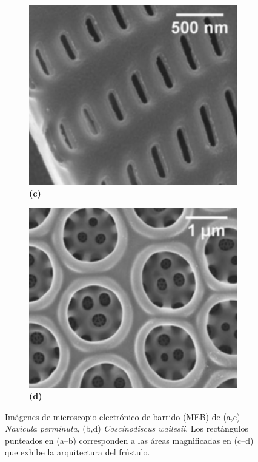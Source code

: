 \documentclass[10pt,aspectratio=1610,compress,dvipsnames]{beamer}
\begin{document}
\begin{frame}
{\begin{figure}
  \begin{subfigure}[b]{0.2\linewidth}
    \includegraphics[width=0.9\linewidth]{Frustrulespictures/Screen Shot 2023-07-02 at 8.25.17 PM.png} %
    \caption*{\textbf{(c)}}
    \label{fig7:c}
  \end{subfigure}\hspace{0.5cm} %
  \begin{subfigure}[b]{0.2\linewidth}
    \includegraphics[width=0.9\linewidth]{Frustrulespictures/Screen Shot 2023-07-02 at 8.25.43 PM.png} %
    \caption*{\textbf{(d)}}
    \label{fig7:d}
  \end{subfigure}
  \caption{
Imágenes de microscopio electrónico de barrido (MEB) de (a,c) - \emph{Navicula perminuta}, (b,d) \emph{Coscinodiscus wailesii}. Los rectángulos punteados en (a–b) corresponden a las áreas magnificadas en (c–d) que exhibe la arquitectura del frústulo. }
  \label{poresfrustrules}
  


\end{figure}}
\end{frame}
\end{document}

